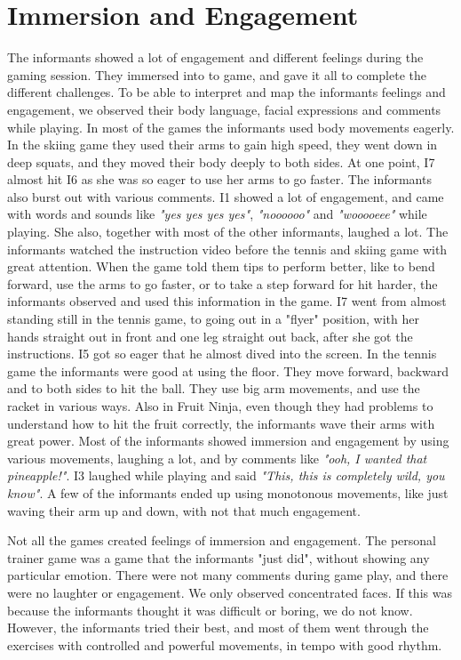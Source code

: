 \section{Immersion and Engagement}
The informants showed a lot of engagement and different feelings during the gaming session. They immersed into to game, and gave it all to complete the different challenges. To be able to interpret and map the informants feelings and engagement, we observed their body language, facial expressions and comments while playing. In most of the games the informants used body movements eagerly. In the skiing game they used their arms to gain high speed, they went down in deep squats, and they moved their body deeply to both sides. At one point, I7 almost hit I6 as she was so eager to use her arms to go faster. The informants also burst out with various comments. I1 showed a lot of engagement, and came with words and sounds like \emph{"yes yes yes yes"}, \emph{"noooooo"} and \emph{"wooooeee"} while playing. She also, together with most of the other informants, laughed a lot. The informants watched the instruction video before the tennis and skiing game with great attention. When the game told them tips to perform better, like to bend forward, use the arms to go faster, or to take a step forward for hit harder, the informants observed and used this information in the game. I7 went from almost standing still in the tennis game, to going out in a "flyer" position, with her hands straight out in front and one leg straight out back, after she got the instructions. I5 got so eager that he almost dived into the screen. In the tennis game the informants were good at using the floor. They move forward, backward and to both sides to hit the ball. They use big arm movements, and use the racket in various ways. Also in Fruit Ninja, even though they had problems to understand how to hit the fruit correctly, the informants wave their arms with great power. Most of the informants showed immersion and engagement by using various movements, laughing a lot, and by comments like \emph{"ooh, I wanted that pineapple!"}. I3 laughed while playing and said \emph{"This, this is completely wild, you know"}. A few of the informants ended up using monotonous movements, like just waving their arm up and down, with not that much engagement. 

Not all the games created feelings of immersion and engagement. The personal trainer game was a game that the informants "just did", without showing any particular emotion. There were not many comments during game play, and there were no laughter or engagement. We only observed concentrated faces. If this was because the informants thought it was difficult or boring, we do not know. However, the informants tried their best, and most of them went through the exercises with controlled and powerful movements, in tempo with good rhythm.       

